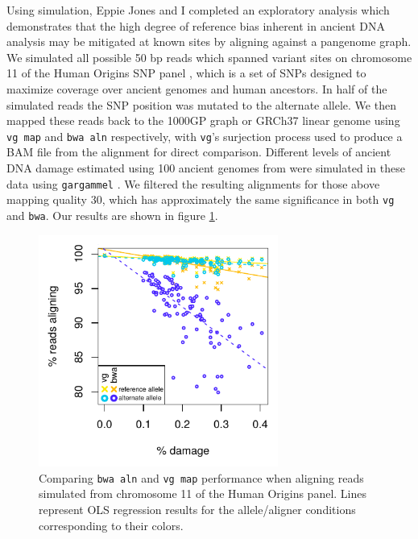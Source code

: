Using simulation, Eppie Jones and I completed an exploratory analysis which demonstrates that the high degree of reference bias inherent in ancient DNA analysis may be mitigated at known sites by aligning against a pangenome graph.
We simulated all possible 50 bp reads which spanned variant sites on chromosome 11 of the Human Origins SNP panel \cite{patterson2012ancient,lazaridis2014ancient}, which is a set of SNPs designed to maximize coverage over ancient genomes and human ancestors.
In half of the simulated reads the SNP position was mutated to the alternate allele.
We then mapped these reads back to the 1000GP graph or GRCh37 linear genome using {\tt vg map} and {\tt bwa aln} respectively, with {\tt vg}'s surjection process used to produce a BAM file from the alignment for direct comparison.
Different levels of ancient DNA damage estimated using 100 ancient genomes from \cite{allentoft2015population} were simulated in these data using {\tt gargammel} \cite{renaud2016gargammel}.
We filtered the resulting alignments for those above mapping quality 30, which has approximately the same significance in both {\tt vg} and {\tt bwa}.
Our results are shown in figure \ref{fig:aDNA_simulations}.

\begin{figure}[htbp!]
  \centering
  \includegraphics[width=0.7\textwidth]{Chapter3/Figs/bwa_vs_vg_ancient_data_simulations_mq30_recolored.pdf}
  \caption[Comparing {\tt bwa aln} and {\tt vg map} using simulated ancient DNA]{
    Comparing {\tt bwa aln} and {\tt vg map} performance when aligning reads simulated from chromosome 11 of the Human Origins panel.
    Lines represent OLS regression results for the allele/aligner conditions corresponding to their colors.
  }
  \label{fig:aDNA_simulations}
\end{figure}


